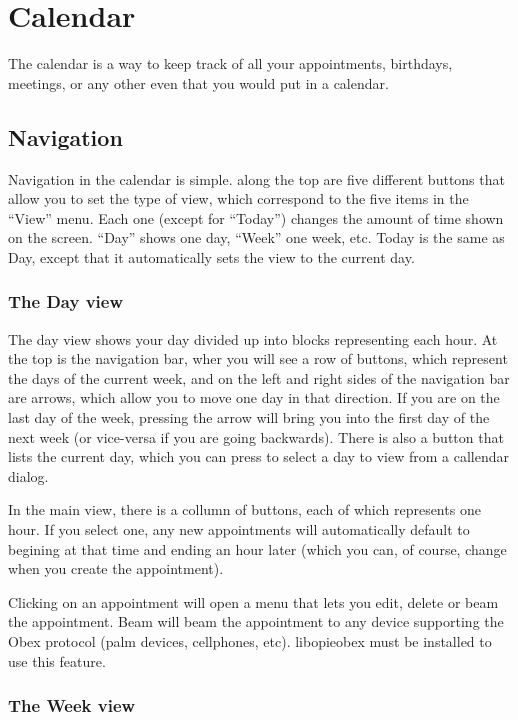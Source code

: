 \documentclass[12pt,letterpaper,oneside, openany]{book} \usepackage[latin1] {inputenc}
\begin{document}
\chapter{Calendar}
The calendar is a way to keep track of all your appointments, birthdays, meetings, or any other even that you would put in a calendar.

\section{Navigation}

Navigation in the calendar is simple. along the top are five different buttons that allow you to set the type of view, which correspond to the five items in the ``View'' menu. Each one (except for ``Today'') changes the amount of time shown on the screen. ``Day'' shows one day, ``Week'' one week, etc. Today is the same as Day, except that it automatically sets the view to the current day. 

\subsection{The Day view}

The day view shows your day divided up into blocks representing each hour. At the top is the navigation bar, wher you will see a row of buttons, which represent the days of the current week, and on the left and right sides of the navigation bar are arrows, which allow you to move one day in that direction. If you are on the last day of the week, pressing the arrow will bring you into the first day of the next week (or vice-versa if you are going backwards). There is also a button that lists the current day, which you can press to select a day to view from a callendar dialog. 

In the main view, there is a collumn of buttons, each of which represents one hour. If you select one, any new appointments will automatically default to begining at that time and ending an hour later (which you can, of course, change when you create the appointment). 

Clicking on an appointment will open a menu that lets you edit, delete or beam the appointment. Beam will beam the appointment to any device supporting the Obex protocol (palm devices, cellphones, etc). libopieobex must be installed to use this feature. 

\subsection{The Week view}
\end{document}
